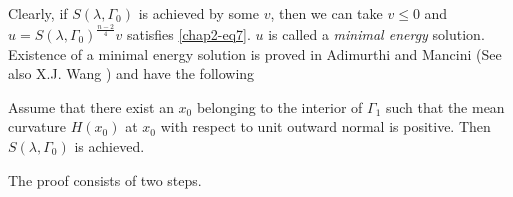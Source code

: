Clearly, if $S(\lambda, \Gamma_{0})$ is achieved by some $v$, then we can take $v\leq 0$ and $u=S(\lambda, \Gamma_{0})^{\frac{n-2}{4}}v$ satisfies \eqref{chap2-eq7}. $u$ is called a \textit{minimal energy} solution. Existence of a minimal energy solution is proved in Adimurthi and Mancini \cite{chap2-key1} (See also X.J. Wang \cite{chap2-key22}) and have the following 

\begin{theorem}\label{chap2-thm4}
Assume that there exist an $x_{0}$ belonging to the interior of $\Gamma_{1}$ such that the mean curvature $H(x_{0})$ at $x_{0}$ with respect to unit outward normal is positive. Then $S(\lambda, \Gamma_{0})$ is achieved.
\end{theorem}

\begin{sketchoftheproof}
The proof consists of two steps.
\end{sketchoftheproof}
